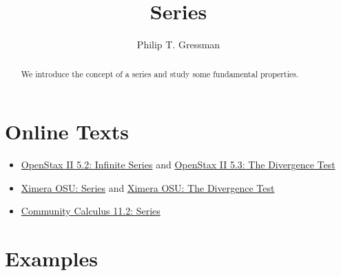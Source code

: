 \documentclass{ximera}
\title{Series}
\author{Philip T. Gressman}
\begin{document}
\begin{abstract}
We introduce the concept of a series and study some fundamental properties.
\end{abstract}
\maketitle

\section*{Online Texts}
\begin{itemize}
\item \href{https://openstax.org/books/calculus-volume-2/pages/5-2-infinite-series}{OpenStax II 5.2: Infinite Series} and \href{https://openstax.org/books/calculus-volume-2/pages/5-3-the-divergence-and-integral-tests}{OpenStax II 5.3: The Divergence Test}
\item \href{https://ximera.osu.edu/mooculus/calculus2/sumsOfSequences/titlePage}{Ximera OSU: Series} and \href{https://ximera.osu.edu/mooculus/calculus2/divergenceTest/titlePage}{Ximera OSU: The Divergence Test}
\item \href{https://www.whitman.edu/mathematics/calculus_online/section11.02.html}{Community Calculus 11.2: Series}
\end{itemize}

\section*{Examples}

\begin{example}

\end{example}

\begin{example}

\end{example}
\end{document}
